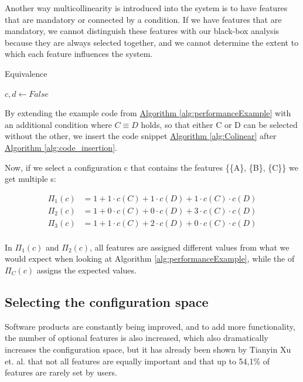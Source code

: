 Another way  multicollinearity is introduced into the system is to have features that are mandatory or connected by a condition. 
If we have features that are mandatory, we cannot distinguish these features with our black-box analysis because they are always selected
together, and we cannot determine the extent to which each feature influences the system. \cite{Multicollinearity}

\begin{algorithm}[h]
    \caption{Equivalence \label{alg:Colinear}}
    \begin{algorithmic}[1]

        \State $c,d \gets False$
    \EndIf

    \end{algorithmic}
    \end{algorithm}

By extending the example code from \hyperref[alg:performanceExample]{Algorithm \ref*{alg:performanceExample}} with an additional condition where $C \equiv D$ holds, 
so that either C or D can be selected without the other, we insert the code snippet \hyperref[alg:Colinear]{Algorithm \ref*{alg:Colinear}} 
after \hyperref[alg:code_insertion]{Algorithm \ref*{alg:code_insertion}}.

Now, if we select a configuration c that contains the features \{\{A\}, \{B\}, \{C\}\} we get multiple {\perfInfluenceModel}s:

\begin{align*}
    \Pi_1(c) &= 1 + 1\cdot c(C) + 1 \cdot c(D) + 1\cdot c(C) \cdot c(D) \\
    \Pi_2(c) &= 1 + 0\cdot c(C) + 0 \cdot c(D) + 3\cdot c(C) \cdot c(D) \\
    \Pi_3(c) &= 1 + 1\cdot c(C) + 2 \cdot c(D) + 0\cdot c(C) \cdot c(D) \\
\end{align*}

In $\Pi_1(c)$ and $\Pi_2(c)$, all features are assigned different values from what we would expect when looking at Algorithm \ref{alg:performanceExample},
while the \perfInfluenceModel of $\Pi_C(c)$ assigns the expected values.

\subsection{Selecting the configuration space}
Software products are constantly being improved, and to add more functionality, the number of optional features is also increased, which also dramatically increases 
the configuration space, but it has already been shown by Tianyin Xu et. al. \cite{TooManyKnobs} that not all features are equally important and that up to
54,1\% of features are rarely set by users.

